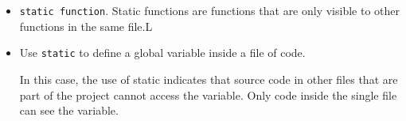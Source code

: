 \begin{itemize}
    \item \verb|static function|. Static functions are functions that are only visible to other functions in the same file.L

    \item Use \verb|static| to define a global variable inside a file of code.
    \begin{remark}
        In this case, the use of static indicates that source code in other files that are part of the project cannot access the variable. Only code inside the single file can see the variable.
    \end{remark}
\end{itemize}




















